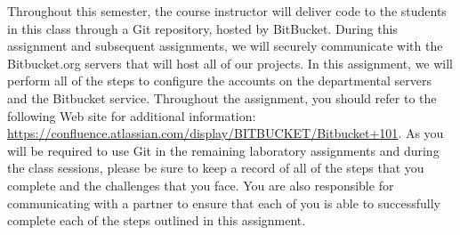 Throughout this semester, the course instructor will deliver code to the students in this class through a Git
repository, hosted by BitBucket.  During this assignment and subsequent assignments, we will securely communicate with
the Bitbucket.org servers that will host all of our projects.  In this assignment, we will perform all of the steps to
configure the accounts on the departmental servers and the Bitbucket service.  Throughout the assignment, you should
refer to the following Web site for additional information:
\url{https://confluence.atlassian.com/display/BITBUCKET/Bitbucket+101}.  As you will be required to use Git in the
remaining laboratory assignments and during the class sessions, please be sure to keep a record of all of
the steps that you complete and the challenges that you face.  You are also responsible for communicating with a partner
to ensure that each of you is able to successfully complete each of the steps outlined in this assignment.

